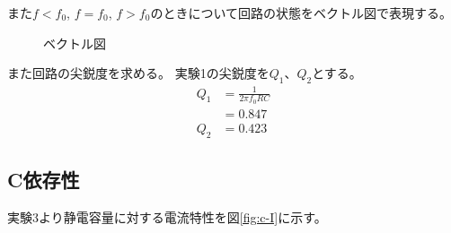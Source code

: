 \documentclass[11pt,a4paper,fleqn]{jsarticle}
\begin{document}
また$f<f_{0}$, $f=f_{0}$, $f>f_{0}$のときについて回路の状態をベクトル図で表現する。

\begin{figure}[H]
\caption{ベクトル図}
\end{figure}

また回路の尖鋭度を求める。
実験1の尖鋭度を$Q_{1}$、$Q_{2}$とする。
\begin{align}
Q_{1}&=\frac{1}{2\pi f_{0}RC}\nonumber\\
&=0.847\label{eq:q1}\\
Q_{2}&=0.423\label{eq:q2}
\end{align}
\subsection{C依存性}
実験3より静電容量に対する電流特性を図\ref{fig:c-I}に示す。
\begin{figure}[H]
\end{figure}
%
\end{document}
